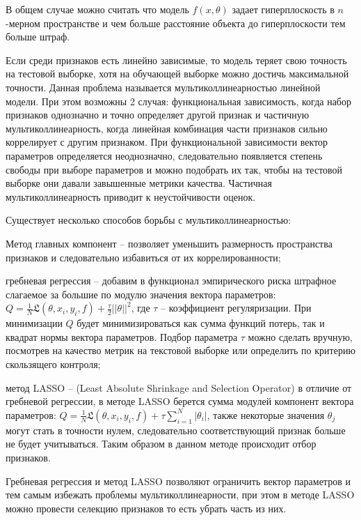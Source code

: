 В общем случае можно считать что модель $f(x,\theta)$ задает гиперплоскость в $n$-мерном пространстве и чем больше расстояние объекта до гиперплоскости тем больше штраф.

Если среди признаков есть линейно зависимые, то модель теряет свою точность на тестовой выборке, хотя на обучающей выборке можно достичь максимальной точности. Данная проблема называется мультиколлинеарностью линейной модели. При этом возможны 2 случая: функциональная зависимость, когда набор признаков однозначно и точно определяет другой признак и частичную мультиколлинеарность, когда линейная комбинация части признаков сильно коррелирует с другим признаком. При функциональной зависимости вектор параметров определяется неоднозначно, следовательно появляется степень свободы при выборе параметров и можно подобрать их так, чтобы на тестовой выборке они давали завышенные метрики качества. Частичная мультиколлинеарность приводит к неустойчивости оценок.

Существует несколько способов борьбы с мультиколлинеарностью: 
\begin{description}[font=$\bullet$]
    \item Метод главных компонент -- позволяет уменьшить размерность пространства признаков и следовательно избавиться от их коррелированности;
    \item гребневая регрессия -- добавим в функционал эмпирического риска штрафное слагаемое за большие по модулю значения вектора параметров: $Q = \frac{1}{N} \mathfrak{L}(\theta,x_i,y_i,f) + \frac{\tau}{2}|| \theta ||^2$, где $\tau$ -- коэффициент регуляризации. При минимизации $Q$ будет минимизироваться как сумма функций потерь, так и квадрат нормы вектора параметров. Подбор параметра $\tau$ можно сделать вручную, посмотрев на качество метрик на текстовой выборке или определить по критерию скользящего контроля;
    \item метод LASSO -- (Least Absolute Shrinkage and Selection Operator) в отличие от гребневой регрессии, в методе LASSO берется сумма модулей компонент вектора параметров: $Q = \frac{1}{N} \mathfrak{L}(\theta,x_i,y_i,f) + \tau\sum\limits_{i=1}^N |\theta_i|$, также некоторые значения $\theta_j$ могут стать в точности нулем, следовательно соответствующий признак больше не будет учитываться. Таким образом в данном методе происходит отбор признаков.
\end{description}

Гребневая регрессия и метод LASSO позволяют ограничить вектор параметров и тем самым избежать проблемы мультиколлинеарности, при этом в методе LASSO можно провести селекцию признаков то есть убрать часть из них.

